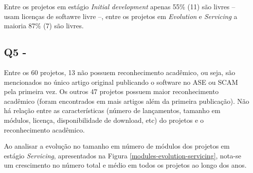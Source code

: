 Entre os projetos em estágio {\it Initial development} apenas 55\% (11) são
livres -- usam licenças de softawre livre --, entre os projetos em {\it
Evolution} e {\it Servicing} a maioria 87\% (7) são livres.

\subsection{Q5 - \QuestaoCinco} %

Entre os 60 projetos, 13 não possuem reconhecimento acadêmico, ou seja, são
mencionados no único artigo original publicando o software no ASE ou SCAM pela
primeira vez. Os outros 47 projetos possuem maior reconhecimento acadêmico
(foram encontrados em mais artigos além da primeira publicação). Não há relação
entre as características (número de lançamentos, tamanho em módulos, licença,
disponibilidade de download, etc) do projetos e o reconhecimento acadêmico.


Ao analisar a evolução no tamanho em número de módulos dos projetos em estágio
{\it Servicing}, apresentados na Figura \ref{modules-evolution-servicing},
nota-se um crescimento no número total e médio em todos os projetos ao longo
dos anos.


